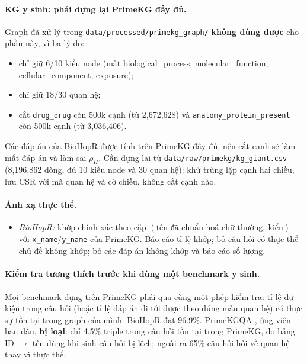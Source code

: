 \documentclass[11pt,a4paper]{article}
\theoremstyle{remark}
\begin{document}
\paragraph{KG y sinh: phải dựng lại PrimeKG đầy đủ.} Graph đã xử lý trong \texttt{data/processed/primekg\_graph/} \textbf{không dùng được} cho phần này, vì ba lý do:
\begin{itemize}[nosep]
  \item chỉ giữ 6/10 kiểu node (mất biological\_process, molecular\_function, cellular\_component, exposure);
  \item chỉ giữ 18/30 quan hệ;
  \item cắt \texttt{drug\_drug} còn 500k cạnh (từ 2{,}672{,}628) và \texttt{anatomy\_protein\_present} còn 500k cạnh (từ 3{,}036{,}406).
\end{itemize}
Các đáp án của BioHopR được tính trên PrimeKG đầy đủ, nên cắt cạnh sẽ làm mất đáp án và làm sai $\rho_H$. Cần dựng lại từ \texttt{data/raw/primekg/kg\_giant.csv} (8{,}196{,}862 dòng, đủ 10 kiểu node và 30 quan hệ): khử trùng lặp cạnh hai chiều, lưu CSR với mã quan hệ và cờ chiều, không cắt cạnh nào.

\paragraph{Ánh xạ thực thể.}
\begin{itemize}[nosep]
  \item \emph{BioHopR:} khớp chính xác theo cặp $(\text{tên đã chuẩn hoá chữ thường},\ \text{kiểu})$ với \texttt{x\_name}/\texttt{y\_name} của PrimeKG. Báo cáo tỉ lệ khớp; bỏ câu hỏi có thực thể chủ đề không khớp; bỏ các đáp án không khớp và báo cáo số lượng.\end{itemize}

\paragraph{Kiểm tra tương thích trước khi dùng một benchmark y sinh.} Mọi benchmark dựng trên PrimeKG phải qua cùng một phép kiểm tra: tỉ lệ dữ kiện trong câu hỏi (hoặc tỉ lệ đáp án đi tới được theo đúng mẫu quan hệ) có thực sự tồn tại trong graph của mình. BioHopR đạt 96.9\%. PrimeKGQA \cite{primekgqa}, ứng viên ban đầu, \textbf{bị loại}: chỉ 4.5\% triple trong câu hỏi tồn tại trong PrimeKG, do bảng ID $\to$ tên dùng khi sinh câu hỏi bị lệch; ngoài ra 65\% câu hỏi hỏi về quan hệ thay vì thực thể.
\end{document}
